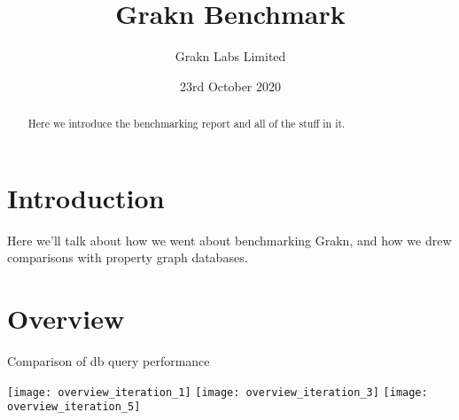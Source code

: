 \documentclass{article}
\begin{document}
\title{Grakn Benchmark}
\date{23rd October 2020}
\author{Grakn Labs Limited}

\maketitle

\begin{abstract}
Here we introduce the benchmarking report and all of the stuff in it.
\end{abstract}

\section{Introduction}
Here we'll talk about how we went about benchmarking Grakn, and how we drew comparisons with property graph databases.

\section{Overview}
Comparison of db query performance

\texttt{[image: overview\_iteration\_1]}
\texttt{[image: overview\_iteration\_3]}
\texttt{[image: overview\_iteration\_5]}
\end{document}
